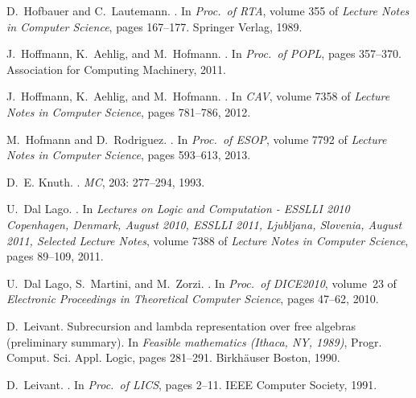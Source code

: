 \documentclass{LMCS}
\begin{document}
\begin{thebibliography}{59}
D.~Hofbauer and C.~Lautemann.
.
\newblock In \emph{Proc.\ of  RTA}, volume 355 of \emph{Lecture Notes in
  Computer Science}, pages 167--177. Springer Verlag, 1989.

J.~Hoffmann, K.~Aehlig, and M.~Hofmann.
.
\newblock In \emph{Proc.\ of  POPL}, pages 357--370. Association for
  Computing Machinery, 2011.

J.~Hoffmann, K.~Aehlig, and M.~Hofmann.
.
\newblock In \emph{CAV}, volume 7358 of \emph{Lecture Notes in Computer
  Science}, pages 781--786, 2012.

M.~Hofmann and D.~Rodriguez.
.
\newblock In \emph{Proc.\ of  ESOP}, volume 7792 of \emph{Lecture Notes
  in Computer Science}, pages 593--613, 2013.

D.~E. Knuth.
.
\newblock \emph{MC}, 203: 277--294, 1993.

U.~Dal Lago.
.
\newblock In \emph{Lectures on Logic and Computation - ESSLLI 2010 Copenhagen,
  Denmark, August 2010, ESSLLI 2011, Ljubljana, Slovenia, August 2011, Selected
  Lecture Notes}, volume 7388 of \emph{Lecture Notes in Computer Science},
  pages 89--109, 2011.

U.~Dal Lago, S.~Martini, and M.~Zorzi.
.
\newblock In \emph{Proc.\ of DICE2010}, volume~23 of \emph{Electronic
  Proceedings in Theoretical Computer Science}, pages 47--62, 2010.

D.~Leivant.
\newblock Subrecursion and lambda representation over free algebras
  (preliminary summary).
\newblock In \emph{Feasible mathematics (Ithaca, NY, 1989)}, Progr. Comput.
  Sci. Appl. Logic, pages 281--291. Birkhäuser Boston, 1990.

D.~Leivant.
.
\newblock In \emph{Proc.\ of  LICS}, pages 2--11. IEEE Computer Society,
  1991.


\end{thebibliography}
\end{document}
